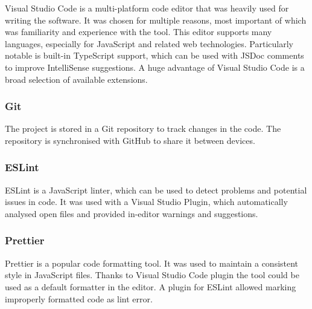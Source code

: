 Visual Studio Code is a multi-platform code editor that was heavily used for writing the software. It was chosen for multiple reasons, most important of which was familiarity and experience with the tool. This editor supports many languages, especially for JavaScript and related web technologies. Particularly notable is built-in TypeScript support, which can be used with JSDoc comments to improve IntelliSense suggestions. A huge advantage of Visual Studio Code is a broad selection of available extensions.

\subsubsection{Git}

The project is stored in a Git repository to track changes in the code. The repository is synchronised with GitHub to share it between devices.

\subsubsection{ESLint}

ESLint is a JavaScript linter, which can be used to detect problems and potential issues in code. It was used with a Visual Studio Plugin, which automatically analysed open files and provided in-editor warnings and suggestions.

\subsubsection{Prettier}

Prettier is a popular code formatting tool. It was used to maintain a consistent style in JavaScript files. Thanks to Visual Studio Code plugin the tool could be used as a default formatter in the editor. A plugin for ESLint allowed marking improperly formatted code as lint error.
